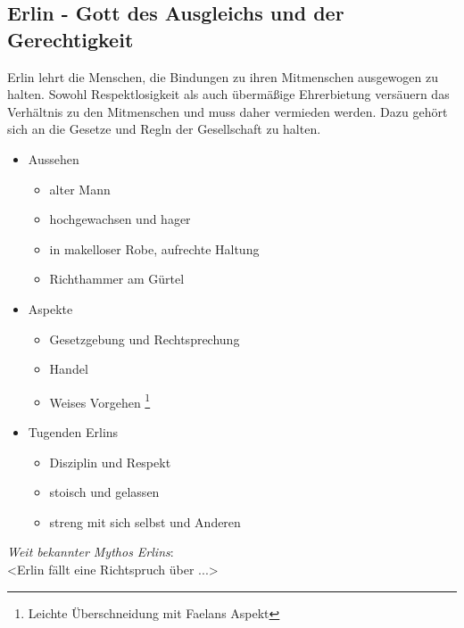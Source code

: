 \subsection{\textbf{Erlin} - Gott des Ausgleichs und der Gerechtigkeit}
Erlin lehrt die Menschen, die Bindungen zu ihren Mitmenschen ausgewogen zu halten. Sowohl Respektlosigkeit als auch übermäßige Ehrerbietung versäuern das Verhältnis 
zu den Mitmenschen und muss daher vermieden werden. Dazu gehört sich an die Gesetze und Regln der Gesellschaft zu halten.\\
\begin{itemize}
	\item Aussehen 
	\begin{itemize}
		\item alter Mann 
		\item hochgewachsen und hager
		\item in makelloser Robe, aufrechte Haltung
		\item Richthammer am Gürtel
	\end{itemize}
	\item Aspekte
	\begin{itemize}
		\item Gesetzgebung und Rechtsprechung
		\item Handel
		\item Weises Vorgehen \footnote{Leichte Überschneidung mit Faelans Aspekt}
	\end{itemize}
	\item Tugenden Erlins
	\begin{itemize}
		\item Disziplin und Respekt
		\item stoisch und gelassen
		\item streng mit sich selbst und Anderen
	\end{itemize}
\end{itemize}
\textit{Weit bekannter Mythos Erlins}:\\
<Erlin fällt eine Richtspruch über ...>

